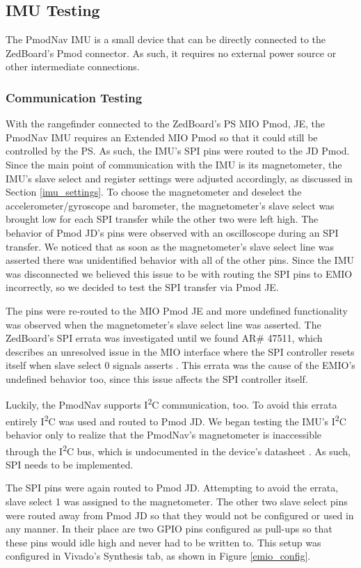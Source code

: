 \subsection{IMU Testing}
The PmodNav IMU is a small device that can be directly connected to the ZedBoard's Pmod connector. As such, it requires no external power source or other intermediate connections.

\subsubsection{Communication Testing}
With the rangefinder connected to the ZedBoard's PS MIO Pmod, JE, the PmodNav IMU requires an Extended MIO Pmod so that it could still be controlled by the PS. As such, the IMU's SPI pins were routed to the JD Pmod. Since the main point of communication with the IMU is its magnetometer, the IMU's slave select and register settings were adjusted accordingly, as discussed in Section \ref{imu_settings}. To choose the magnetometer and deselect the accelerometer/gyroscope and barometer, the magnetometer's slave select was brought low for each SPI transfer while the other two were left high. The behavior of Pmod JD's pins were observed with an oscilloscope during an SPI transfer. We noticed that as soon as the magnetometer's slave select line was asserted there was unidentified behavior with all of the other pins. Since the IMU was disconnected we believed this issue to be with routing the SPI pins to EMIO incorrectly, so we decided to test the SPI transfer via Pmod JE.
\par
The pins were re-routed to the MIO Pmod JE and more undefined functionality was observed when the magnetometer's slave select line was asserted. The ZedBoard's SPI errata was investigated until we found AR\# 47511, which describes an unresolved issue in the MIO interface where the SPI controller resets itself when slave select 0 signals asserts \cite{zedboardErrata}. This errata was the cause of the EMIO's undefined behavior too, since this issue affects the SPI controller itself.
\par
Luckily, the PmodNav supports I\textsuperscript{2}C communication, too. To avoid this errata entirely I\textsuperscript{2}C was used and routed to Pmod JD. We began testing the IMU's I\textsuperscript{2}C behavior only to realize that the PmodNav's magnetometer is inaccessible through the I\textsuperscript{2}C bus, which is undocumented in the device's datasheet \cite{lsm9ds1}. As such, SPI needs to be implemented.
\par
The SPI pins were again routed to Pmod JD. Attempting to avoid the errata, slave select 1 was assigned to the magnetometer. The other two slave select pins were routed away from Pmod JD so that they would not be configured or used in any manner. In their place are two GPIO pins configured as pull-ups so that these pins would idle high and never had to be written to. This setup was configured in Vivado's Synthesis tab, as shown in Figure \ref{emio_config}. 

